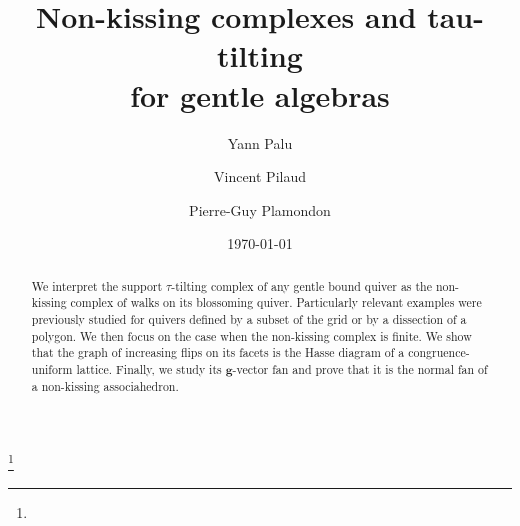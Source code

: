 \documentclass{memo-l}
\theoremstyle{definition}
\renewcommand{\b}[1]{\mathbf{#1}} %
\begin{document}
\frontmatter

\title[Non-kissing complexes and tau-tilting for gentle algebras]{Non-kissing complexes and tau-tilting \\ for gentle algebras}

\thanks{}

\author{Yann Palu}
\address[Yann Palu]{LAMFA, Universit\'e Picardie Jules Verne, Amiens}

\author{Vincent Pilaud}
\address[Vincent Pilaud]{CNRS \& LIX, \'Ecole Polytechnique, Palaiseau}

\author{Pierre-Guy Plamondon}
\address[Pierre-Guy Plamondon]{Laboratoire de Math\'ematiques d'Orsay, Universit\'e Paris-Sud, CNRS, Universit\'e Paris-Saclay}

\date{\today}



\renewcommand{\leftmark}{\sc Non-kissing complexes and tau-tilting for gentle algebras}
\renewcommand{\rightmark}{\sc \authors}

\begin{abstract}
We interpret the support $\tau$-tilting complex of any gentle bound quiver as the non-kissing complex of walks on its blossoming quiver.
Particularly relevant examples were previously studied for quivers defined by a subset of the grid or by a dissection of a polygon.
We then focus on the case when the non-kissing complex is finite.
We show that the graph of increasing flips on its facets is the Hasse diagram of a congruence-uniform lattice.
Finally, we study its $\b{g}$-vector fan and prove that it is the normal fan of a non-kissing associahedron.
\end{abstract}
\end{document}
